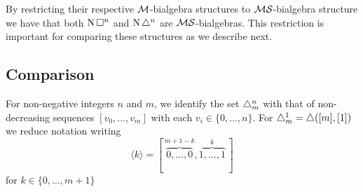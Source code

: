 By restricting their respective $\mathcal{M}$-bialgebra structures to $\mathcal{MS}$-bialgebra structure we have that both $\operatorname{N} \square^n$ and $\operatorname{N} \triangle^n$ are $\mathcal{MS}$-bialgebras.
This restriction is important for comparing these structures as we describe next.

\subsection{Comparison}


For non-negative integers $n$ and $m$, we identify the set $\triangle^n_m$ with that of non-decreasing sequences $[v_0, \dots, v_m]$ with each $v_i \in \{0, \dots, n\}$.
For $\triangle^1_m = \triangle([m], [1])$ we reduce notation writing
\begin{equation*}
\langle k \rangle = [\, \overbrace{0,\dots,0}^{m+1-k}, \overbrace{1,\dots,1}^{k}\,]
\end{equation*}
for $k \in \{0, \dots, m+1\}$


